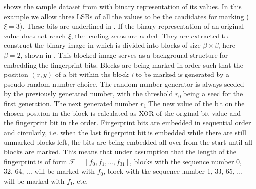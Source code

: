  shows the sample dataset from  with binary representation of its values. 
In this example we allow three LSBs of all the values to be the candidates for marking ($\xi=3$). These bits are underlined in . 
If the binary representation of an original value does not reach $\xi$, the leading zeros are added.
They are extracted to construct the binary image in  which is divided into blocks of size $\beta \times \beta$, here $\beta=2$, shown in .
This blocked image serves as a background structure for embedding the fingerprint bits. 
Blocks are being marked in order such that the position $(x,y)$ of a bit within the block \textit{i} to be marked is generated by a pseudo-random number choice. 
The random number generator is always seeded by the previously generated number, with the threshold $r_0$ being a seed for the first generation.
The next generated number $r_1$ 
The new value of the bit on the chosen position in the block is calculated as XOR of the original bit value and the fingerprint bit in the order.
Fingerprint bits are embedded in sequential order and circularly, i.e. when the last fingerprint bit is embedded while there are still unmarked blocks left, the bits are being embedded all over from the start until all blocks are marked. 
This means that under assumption that the length of the fingerprint is of form $\mathcal{F}=[f_0,f_1,...,f_31]$, blocks with the sequence number 0, 32, 64, ... will be marked with $f_0$, block with the sequence number 1, 33, 65, ... will be marked with $f_1$, etc.


